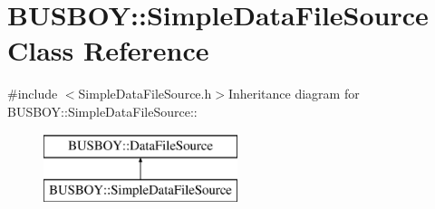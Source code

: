 \hypertarget{classBUSBOY_1_1SimpleDataFileSource}{
\section{BUSBOY::SimpleDataFileSource Class Reference}
\label{classBUSBOY_1_1SimpleDataFileSource}
}


{\ttfamily \#include $<$SimpleDataFileSource.h$>$}Inheritance diagram for BUSBOY::SimpleDataFileSource::\begin{figure}[H]
\begin{center}
\leavevmode
\includegraphics[height=2cm]{classBUSBOY_1_1SimpleDataFileSource}
\end{center}
\end{figure}

